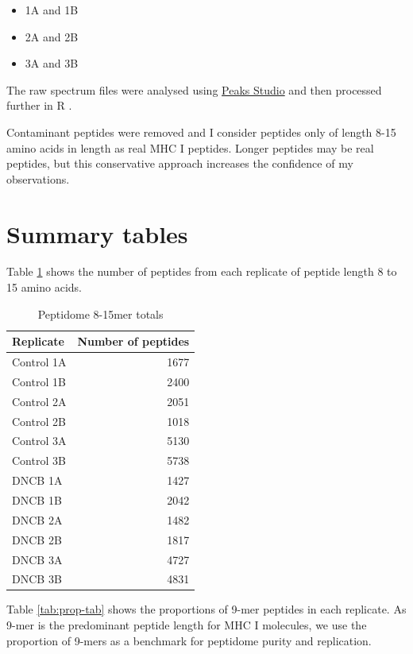 \documentclass[12pt,]{book}
\providecommand{\tightlist}{%
  \setlength{\itemsep}{0pt}\setlength{\parskip}{0pt}}
\begin{document}
\begin{itemize}
\tightlist
\item
  1A and 1B
\item
  2A and 2B
\item
  3A and 3B
\end{itemize}

The raw spectrum files were analysed using
\href{http://www.bioinfor.com/peaks-studio/}{Peaks Studio}
\citep{zhang2012} and then processed further in R \citep{R-base}.

Contaminant peptides were removed and I consider peptides only of length
8-15 amino acids in length as real MHC I peptides. Longer peptides may
be real peptides, but this conservative approach increases the
confidence of my observations.

\section{Summary tables}\label{summary-tables}

Table \ref{tab:summary-tab} shows the number of peptides from each
replicate of peptide length 8 to 15 amino acids.

\begin{table}

\caption{\label{tab:summary-tab}Peptidome 8-15mer totals}
\centering
\begin{tabular}[t]{lr}
\toprule
Replicate & Number of peptides\\
\midrule
Control 1A & 1677\\
Control 1B & 2400\\
Control 2A & 2051\\
Control 2B & 1018\\
Control 3A & 5130\\
\addlinespace
Control 3B & 5738\\
DNCB 1A & 1427\\
DNCB 1B & 2042\\
DNCB 2A & 1482\\
DNCB 2B & 1817\\
\addlinespace
DNCB 3A & 4727\\
DNCB 3B & 4831\\
\bottomrule
\end{tabular}
\end{table}

Table \ref{tab:prop-tab} shows the proportions of 9-mer peptides in each
replicate. As 9-mer is the predominant peptide length for MHC I
molecules, we use the proportion of 9-mers as a benchmark for peptidome
purity and replication.
\end{document}
